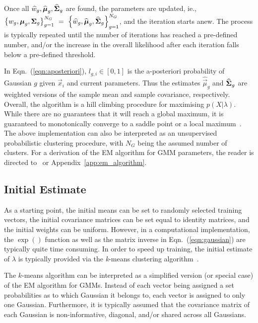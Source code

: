 \noindent
Once all $\widehat{w}_g, \widehat{{\boldsymbol{\mu}}}_g, \widehat{{\boldsymbol{\Sigma}}}_g$ are found, the parameters are updated,
ie., $\left\{ w_g, {\boldsymbol{\mu}}_g, {\boldsymbol{\Sigma}}_g \right\}_{g=1}^{N_G} ~ = ~ \left\{ \widehat{w}_g, \widehat{{\boldsymbol{\mu}}}_g, \widehat{{\boldsymbol{\Sigma}}}_g \right\}_{g=1}^{N_G}$,
and the iteration starts anew.
The process is typically repeated until the number of iterations has reached a pre-defined number,
and/or the increase in the overall likelihood after each iteration falls below a pre-defined threshold.

\noindent In Eqn.~(\ref{eqn:aposteriori}), $l_{g,i} \in [0,1]$ is the {a-posteriori} probability of Gaussian $g$ given $\Vec{x}_i$ and current parameters.
Thus the estimates $\widehat{\Vec{\mu}}_g$ and $\widehat{{\boldsymbol{\Sigma}}}_g$ are weighted versions of the
sample mean and sample covariance, respectively.
Overall, the algorithm is a hill climbing procedure for maximising $p(X | \lambda)$.
While there are no guarantees that it will reach a global maximum, it is guaranteed to monotonically converge to a saddle point or a local maximum~\cite{Dempster77,Duda01,Mitchell97}.
The above implementation can also be interpreted as an unsupervised probabilistic clustering procedure,
with $N_G$ being the assumed number of clusters.
For a derivation of the EM algorithm for GMM parameters, the reader is directed to~\cite{Bilmes98, Redner84} or Appendix~\ref{app:em_algorithm}.

\subsection{Initial Estimate}
\label{sec:initial_estimate}

As a starting point, the initial means can be set to randomly selected training vectors,
the initial covariance matrices can be set equal to identity matrices, 
and the initial weights can be uniform.
However, in a computational implementation, the $\exp()$ function as well as the matrix inverse in Eqn.~(\ref{eqn:gaussian}) are typically quite time consuming.
In order to speed up training, the initial estimate of $\lambda$ is typically provided via the {\it k}-means clustering algorithm~\cite{Duda01}.

The $k$-means algorithm can be interpreted as a simplified version (or special case) of the EM algorithm for GMMs.
Instead of each vector being assigned a set probabilities as to which Gaussian it belongs to,
each vector is assigned to only one Gaussian.
Furthermore, it is typically assumed that the covariance matrix of each Gaussian is non-informative, diagonal, and/or shared across all Gaussians.


